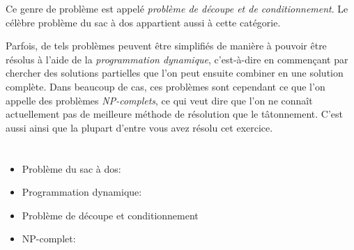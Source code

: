 {{Ce genre de problème est appelé \emph{problème de découpe et de conditionnement}. Le célèbre problème du sac à dos appartient aussi à cette catégorie.

Parfois, de tels problèmes peuvent être simplifiés de manière à pouvoir être résolus à l’aide de la \emph{programmation dynamique}, c’est-à-dire en commençant par chercher des solutions partielles que l’on peut ensuite combiner en une solution complète. Dans beaucoup de cas, ces problèmes sont cependant ce que l’on appelle des problèmes \emph{NP-complets}, ce qui veut dire que l’on ne connaît actuellement pas de meilleure méthode de résolution que le tâtonnement. C’est aussi ainsi que la plupart d’entre vous avez résolu cet exercice.



\section*{\BrochureWebsitesAndKeywords}
{\raggedright
\begin{itemize}
  \item Problème du sac à dos: \href{https://fr.wikipedia.org/wiki/Probl\%C3\%A8me_du_sac_\%C3\%A0_dos}{}
  \item Programmation dynamique: \href{https://fr.wikipedia.org/wiki/Programmation_dynamique}{}
  \item Problème de découpe et conditionnement
  \item NP-complet: \href{https://fr.wikipedia.org/wiki/Probl\%C3\%A8me_NP-complet}{}
\end{itemize}


}

}{}

\def\AuthorOzebekD{} %
\def\AuthorCerarS{} %
\def\AuthorKinciusV{} %
\def\AuthorPhillippsM{} %
\def\AuthorGallenbacherJ{} %
\def\AuthorDatzkoS{} %
\def\AuthorPelletE{} %

\newpage}{}
